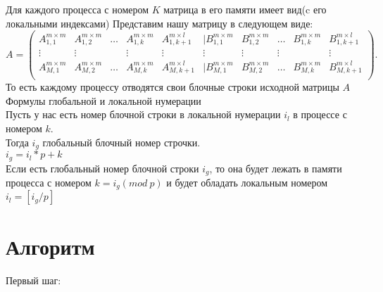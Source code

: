 \documentclass[a4paper,12pt]{article}
\begin{document}
Для каждого процесса с номером $K$ матрица в его памяти имеет вид(c его локальными индексами)
Представим нашу матрицу в следующем виде:
\begin{equation*}
A = 
\begin{pmatrix}
A_{1,1}^{m \times m} & A_{1,2}^{m \times m} & \dots & A_{1,k}^{m \times m} & A_{1,k+1}^{m \times l} & | B_{1,1}^{m \times m} & B_{1,2}^{m \times m} & \dots & B_{1,k}^{m\times m} & B_{1,k+1}^{m \times l}\\
\vdots & \vdots &  & \vdots & \vdots &\vdots  &\vdots   &\vdots  & \  &\vdots \\
A_{M,1}^{m \times m} & A_{M,2}^{m \times m} & \dots & A_{M,k}^{m \times m} & A_{M,k+1}^{m \times l}& | B_{M,1}^{m \times m} & B_{M,2}^{m \times m} & \dots & B_{M,k}^{m\times m} & B_{M,k+1}^{m \times l}\\
\end{pmatrix}.
\end{equation*}
То есть каждому процессу отводятся свои блочные строки исходной матрицы $A$ \\

{\fontsize{14}{14}\selectfont Формулы глобальной и локальной нумерации}\\

Пусть у нас есть номер блочной строки в локальной нумерации $i_l$ в процессе с номером $k$. \\
Тогда $i_g$ глобальный блочный номер строчки.\\
$i_g = i_l*p + k$\\
Если есть глобальный номер блочной строки  $i_g$, то она будет лежать в памяти процесса с номером $k = i_g(mod \ p)$ и будет обладать локальным номером $i_l = [i_g/p]$ \\

\section{Алгоритм}

{\fontsize{14}{14}\selectfont Первый шаг:}\\
\end{document}
